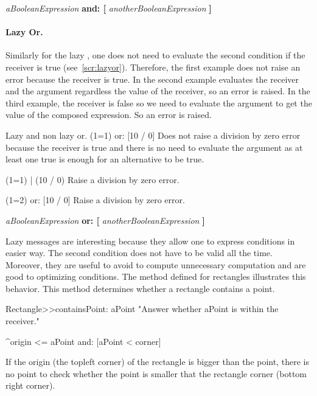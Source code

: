\begin{template}
\textit{aBooleanExpression} \textbf{and: [} \textit{anotherBooleanExpression} \textbf{]}
\end{template}


\paragraph{Lazy Or.} Similarly for the lazy , one does not need to evaluate the second condition if the receiver is true (see~\ref{scr:lazyor}). Therefore, the first example does not raise an error because the receiver is true. In the second example \ct{$\dim$} evaluates the receiver and the argument regardless the value of the receiver, so an error is raised. In the third example, the receiver is false so we need to evaluate the argument to get the value of the composed expression. So an error is raised. 

\begin{scriptwithtitle}{Lazy and non lazy or.}\label{scr:lazyor}
(1=1) or: [10 / 0]
\textrm{Does not raise a division by zero error because the receiver is true and there is no need to evaluate the argument as at least one true is enough for an alternative to be true.}

(1=1) | (10 / 0)
\textrm{Raise a division by zero error.}

(1=2) or: [10 / 0]
\textrm{Raise a division by zero error.}
\end{scriptwithtitle}

\begin{template}
\textit{aBooleanExpression} \textbf{or: [} \textit{anotherBooleanExpression} \textbf{]}
\end{template}

Lazy messages are interesting because they allow one to express conditions in easier way. The 
second condition does not have to be valid all the time. Moreover, they are useful to avoid to compute unnecessary computation and are good to optimizing conditions. The method  defined for rectangles illustrates this behavior. This method determines whether a rectangle contains a point.

\begin{method}
Rectangle>>containsPoint: aPoint 
   "Answer whether aPoint is within the receiver."

   ^origin <= aPoint and: [aPoint < corner]
\end{method}

If the origin (the topleft corner) of the rectangle is bigger than the point, there is no point to check whether the point is smaller that the rectangle corner (bottom right corner). 
 